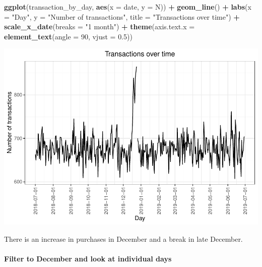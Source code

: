 \documentclass[
]{article}
\newenvironment{Shaded}{\begin{snugshade}}{\end{snugshade}}
\newcommand{\AttributeTok}[1]{\textcolor[rgb]{0.13,0.29,0.53}{#1}}
\newcommand{\DecValTok}[1]{\textcolor[rgb]{0.00,0.00,0.81}{#1}}
\newcommand{\FloatTok}[1]{\textcolor[rgb]{0.00,0.00,0.81}{#1}}
\newcommand{\FunctionTok}[1]{\textcolor[rgb]{0.13,0.29,0.53}{\textbf{#1}}}
\newcommand{\NormalTok}[1]{#1}
\newcommand{\SpecialCharTok}[1]{\textcolor[rgb]{0.81,0.36,0.00}{\textbf{#1}}}
\newcommand{\StringTok}[1]{\textcolor[rgb]{0.31,0.60,0.02}{#1}}
\begin{document}
\begin{Shaded}
\begin{Highlighting}[]
\FunctionTok{ggplot}\NormalTok{(transaction\_by\_day, }\FunctionTok{aes}\NormalTok{(}\AttributeTok{x =}\NormalTok{ date, }\AttributeTok{y =}\NormalTok{ N)) }\SpecialCharTok{+}
\FunctionTok{geom\_line}\NormalTok{() }\SpecialCharTok{+}
\FunctionTok{labs}\NormalTok{(}\AttributeTok{x =} \StringTok{"Day"}\NormalTok{, }\AttributeTok{y =} \StringTok{"Number of transactions"}\NormalTok{, }\AttributeTok{title =} \StringTok{"Transactions over time"}\NormalTok{) }\SpecialCharTok{+}
\FunctionTok{scale\_x\_date}\NormalTok{(}\AttributeTok{breaks =} \StringTok{"1 month"}\NormalTok{) }\SpecialCharTok{+}  \FunctionTok{theme}\NormalTok{(}\AttributeTok{axis.text.x =} \FunctionTok{element\_text}\NormalTok{(}\AttributeTok{angle =} \DecValTok{90}\NormalTok{, }\AttributeTok{vjust =} \FloatTok{0.5}\NormalTok{))}
\end{Highlighting}
\end{Shaded}

\begin{center}\includegraphics{quantium_analysis_files/figure-latex/unnamed-chunk-17-1} \end{center}

There is an increase in purchases in December and a break in late
December.

\hypertarget{filter-to-december-and-look-at-individual-days}{%
\paragraph{Filter to December and look at individual
days}\label{filter-to-december-and-look-at-individual-days}}
\end{document}
